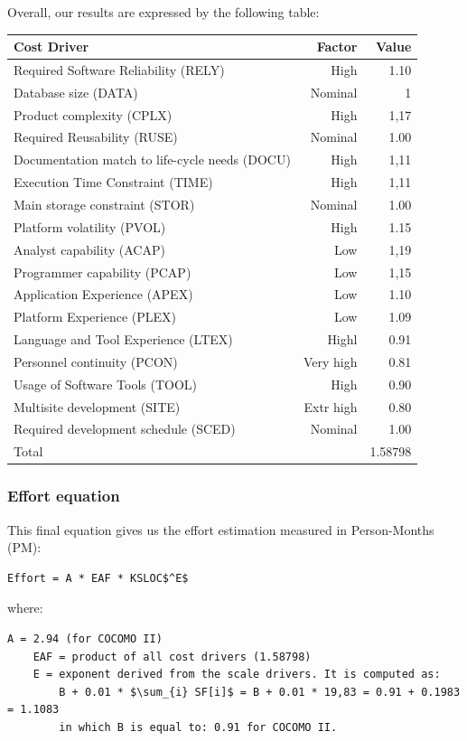 \documentclass[english]{article}
\newcommand{\fptotal}[1]{
	\multicolumn{2}{|l|}{{Total}}
	& #1\\\hline
}
\newenvironment{factorcounttable}[1]{
	\begin{center}
	\begin{longtable}{|l|r|r|}
	\hline 
	#1 & Factor & Value \\\hline
}{
	\end{longtable}\end{center}
}
\begin{document}
\pagebreak
Overall, our results are expressed by the following table:
\begin{factorcounttable}{Cost Driver}
	Required Software Reliability (RELY) & High & 1.10\\
	Database size (DATA) & Nominal & 1\\
	Product complexity (CPLX) & High & 1,17\\
	Required Reusability (RUSE) & Nominal & 1.00\\
	Documentation match to life-cycle needs (DOCU) & High & 1,11\\
	Execution Time Constraint (TIME) & High & 1,11 \\
	Main storage constraint (STOR) & Nominal & 1.00 \\
	Platform volatility (PVOL) & High & 1.15 \\
	Analyst capability (ACAP) & Low & 1,19 \\
	Programmer capability (PCAP) & Low & 1,15 \\
	Application Experience (APEX) & Low & 1.10 \\
	Platform Experience (PLEX) & Low & 1.09 \\
	Language and Tool Experience (LTEX) & Highl & 0.91 \\
	Personnel continuity (PCON) & Very high & 0.81 \\
	Usage of Software Tools (TOOL) & High & 0.90 \\
	Multisite development (SITE) & Extr high & 0.80\\
	Required development schedule (SCED) & Nominal & 1.00 \\\hline
	\fptotal{1.58798}
\end{factorcounttable}

\subsubsection{Effort equation}
This final equation gives us the effort estimation measured in Person-Months (PM):
\begin{lstlisting}[mathescape, numbers=none, frame=single]
	Effort = A * EAF * KSLOC$^E$
\end{lstlisting}
where:
\begin{lstlisting}[mathescape, numbers=none, frame=single]
	A = 2.94 (for COCOMO II) 
	EAF = product of all cost drivers (1.58798)
	E = exponent derived from the scale drivers. It is computed as:
		B + 0.01 * $\sum_{i} SF[i]$ = B + 0.01 * 19,83 = 0.91 + 0.1983 = 1.1083
		in which B is equal to: 0.91 for COCOMO II.
\end{lstlisting}
\end{document}
